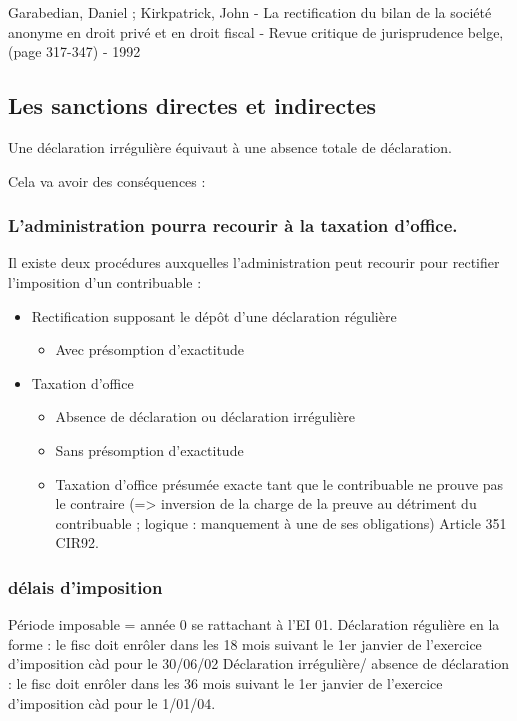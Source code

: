 \documentclass{book}
\begin{document}
Garabedian, Daniel ; Kirkpatrick, John  - La rectification du bilan de la société anonyme en droit privé et en droit fiscal -  Revue critique de jurisprudence belge, (page 317-347) - 1992

\subsection{Les sanctions directes et indirectes}

Une déclaration irrégulière équivaut à une absence totale de déclaration. 

Cela va avoir des conséquences : 

\subsubsection{L’administration pourra recourir à la taxation d’office.}

Il existe deux procédures auxquelles l’administration peut recourir pour rectifier l’imposition d’un contribuable : 
\begin{itemize}
\item Rectification supposant le dépôt d’une déclaration régulière 
\begin{itemize}
\item Avec présomption d’exactitude 
\end{itemize}

\item Taxation d’office 
\begin{itemize}
\item Absence de déclaration ou déclaration irrégulière 
\item Sans présomption d’exactitude 
\item Taxation d’office présumée exacte tant que le contribuable ne prouve pas le contraire (=> inversion de la charge de la preuve au détriment du contribuable ; logique : manquement à une de ses obligations) Article 351 CIR92.
\end{itemize}
\end{itemize}

\subsubsection{délais d’imposition} 
Période imposable = année 0 se rattachant à l’EI 01.
Déclaration régulière en la forme : le fisc doit enrôler dans les 18 mois suivant le 1er janvier de l’exercice d’imposition càd pour le 30/06/02
Déclaration irrégulière/ absence de déclaration : le fisc doit enrôler dans les 36 mois suivant le 1er janvier de l’exercice d’imposition càd pour le 1/01/04. 
\end{document}
